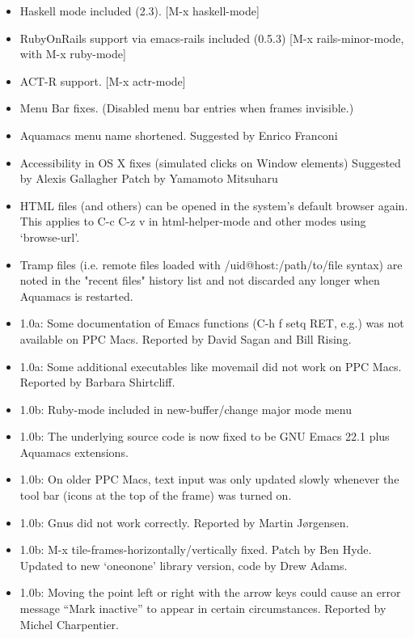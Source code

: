 \begin{itemize}
\item Haskell mode included (2.3). [M-x haskell-mode]
	
\item RubyOnRails support via emacs-rails included (0.5.3)
					[M-x rails-minor-mode, with M-x ruby-mode]

\item ACT-R support. [M-x actr-mode]
	
\item Menu Bar fixes. (Disabled menu bar entries when frames invisible.)

\item Aquamacs menu name shortened.
	Suggested by Enrico Franconi
	
\item Accessibility in OS X fixes (simulated clicks on Window elements)
	Suggested by Alexis Gallagher
	Patch by Yamamoto Mitsuharu

\item HTML files (and others) can be opened in the system's default
	browser again. This applies to C-c C-z v in html-helper-mode and
	other modes using `browse-url'.

\item  Tramp files (i.e. remote files loaded with
	/uid@host:/path/to/file syntax) are noted in the "recent files"
	history list and not discarded any longer when Aquamacs is
	restarted.

\item 1.0a: Some documentation of Emacs functions (C-h f setq RET, e.g.) was not available on PPC Macs.
  Reported by David Sagan and Bill Rising.
\item 1.0a: Some additional executables like movemail did not work on PPC Macs.
Reported by Barbara Shirtcliff.

\item 1.0b: Ruby-mode included in new-buffer/change major mode menu

\item 1.0b: The underlying source code is now fixed to be GNU Emacs 22.1 plus Aquamacs extensions. 

\item 1.0b: On older PPC Macs, text input was only updated slowly whenever the tool bar (icons at the top of the frame) was turned on.

\item 1.0b: Gnus did not work correctly. Reported by Martin Jørgensen.

\item 1.0b: M-x tile-frames-{horizontally/vertically} fixed. Patch by Ben Hyde. Updated to new `oneonone' library version, code by Drew Adams.

\item 1.0b: Moving the point left or right with the arrow keys could cause an error message ``Mark inactive'' to appear in certain circumstances. Reported by Michel Charpentier.


\end{itemize}

